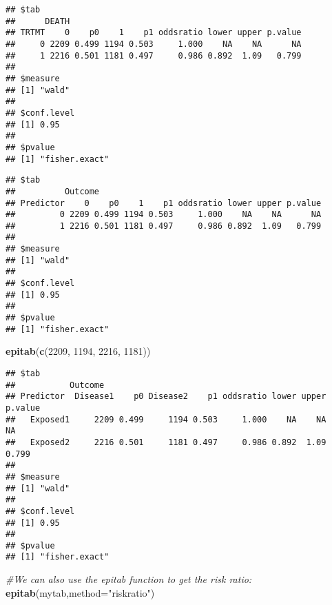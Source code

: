 \documentclass[]{book}
\newenvironment{Shaded}{\begin{snugshade}}{\end{snugshade}}
\newcommand{\KeywordTok}[1]{\textcolor[rgb]{0.13,0.29,0.53}{\textbf{#1}}}
\newcommand{\DataTypeTok}[1]{\textcolor[rgb]{0.13,0.29,0.53}{#1}}
\newcommand{\DecValTok}[1]{\textcolor[rgb]{0.00,0.00,0.81}{#1}}
\newcommand{\StringTok}[1]{\textcolor[rgb]{0.31,0.60,0.02}{#1}}
\newcommand{\CommentTok}[1]{\textcolor[rgb]{0.56,0.35,0.01}{\textit{#1}}}
\newcommand{\OperatorTok}[1]{\textcolor[rgb]{0.81,0.36,0.00}{\textbf{#1}}}
\newcommand{\NormalTok}[1]{#1}
\theoremstyle{definition}
\theoremstyle{definition}
\theoremstyle{definition}
\theoremstyle{remark}
\begin{document}
\begin{verbatim}
## $tab
##      DEATH
## TRTMT    0    p0    1    p1 oddsratio lower upper p.value
##     0 2209 0.499 1194 0.503     1.000    NA    NA      NA
##     1 2216 0.501 1181 0.497     0.986 0.892  1.09   0.799
## 
## $measure
## [1] "wald"
## 
## $conf.level
## [1] 0.95
## 
## $pvalue
## [1] "fisher.exact"
\end{verbatim}

\begin{Shaded}
\end{Shaded}

\begin{verbatim}
## $tab
##          Outcome
## Predictor    0    p0    1    p1 oddsratio lower upper p.value
##         0 2209 0.499 1194 0.503     1.000    NA    NA      NA
##         1 2216 0.501 1181 0.497     0.986 0.892  1.09   0.799
## 
## $measure
## [1] "wald"
## 
## $conf.level
## [1] 0.95
## 
## $pvalue
## [1] "fisher.exact"
\end{verbatim}

\begin{Shaded}
\begin{Highlighting}[]
\KeywordTok{epitab}\NormalTok{(}\KeywordTok{c}\NormalTok{(}\DecValTok{2209}\NormalTok{, }\DecValTok{1194}\NormalTok{, }\DecValTok{2216}\NormalTok{, }\DecValTok{1181}\NormalTok{))}
\end{Highlighting}
\end{Shaded}

\begin{verbatim}
## $tab
##           Outcome
## Predictor  Disease1    p0 Disease2    p1 oddsratio lower upper p.value
##   Exposed1     2209 0.499     1194 0.503     1.000    NA    NA      NA
##   Exposed2     2216 0.501     1181 0.497     0.986 0.892  1.09   0.799
## 
## $measure
## [1] "wald"
## 
## $conf.level
## [1] 0.95
## 
## $pvalue
## [1] "fisher.exact"
\end{verbatim}

\begin{Shaded}
\begin{Highlighting}[]
\CommentTok{#We can also use the epitab function to get the risk ratio:}
\KeywordTok{epitab}\NormalTok{(mytab,}\DataTypeTok{method=}\StringTok{"riskratio"}\NormalTok{)}
\end{Highlighting}
\end{Shaded}
\end{document}
